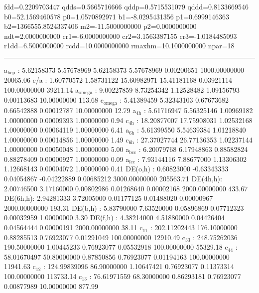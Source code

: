 \documentclass[11pt]{article}
\begin{document}
fdd=0.2209703447 qdds=0.5665716666 qddp=0.5715531079 qddd=0.8133669546 b0=52.1569460578 p0=1.0570892971 b1=-8.0295431356 p1=0.6999146363 b2=1366555.8524337406 m2=-11.5000000000 p2=0.0000000000 ndt=2.0000000000 cr1=-6.0000000000 cr2=3.1563387155 cr3=-1.0184485093 r1dd=6.5000000000 rcdd=10.0000000000 rmaxhm=10.1000000000 npar=18 

\noindent\rule{\textwidth}{0.5pt}
a\(_{\text{hcp}}\)   :   5.62158373   5.57678969   5.62158373   5.57678969   0.00200651 1000.00000000     20065.06
c/a     :   1.60770572   1.58731122  15.60982971  15.41181168   0.03921114 100.00000000     39211.14
a\(_{\text{omega}}\) :   9.00227859   8.73254342   1.12528482   1.09156793   0.00113683  10.00000000       113.68
c\(_{\text{omega}}\) :   5.41389459   5.32343103   0.67673682   0.66542888   0.00012787  10.00000000        12.79
a\(_{\text{4h}}\)    :   5.61716947   5.56325146   1.00969182   1.00000000   0.00009393   1.00000000         0.94
c\(_{\text{4h}}\)    :  18.20877007  17.75908031   1.02532168   1.00000000   0.00064119   1.00000000         6.41
a\(_{\text{6h}}\)    :   5.61399550   5.54639384   1.01218840   1.00000000   0.00014856   1.00000000         1.49
c\(_{\text{6h}}\)    :  27.37027744  26.77136353   1.02237144   1.00000000   0.00050048   1.00000000         5.00
a\(_{\text{bcc}}\)   :   6.20079768   6.17948863   0.88582824   0.88278409   0.00000927   1.00000000         0.09
a\(_{\text{fcc}}\)   :   7.93144116   7.88677000   1.13306302   1.12668143   0.00004072   1.00000000         0.41
DE(o,h) :   0.60823000  -0.63343333   0.04054867  -0.04222889   0.00685212 3000.00000000    205563.71
DE(4h,h):   2.00746500   3.17160000   0.00802986   0.01268640   0.00002168 2000.00000000       433.67
DE(6h,h):   2.94281333   3.72005000   0.01177125   0.01488020   0.00000967 2000.00000000       193.31
DE(b,h) :   5.83790000   7.63520000   0.05896869   0.07712323   0.00032959   1.00000000         3.30
DE(f,h) :   4.38214000   4.51880000   0.04426404   0.04564444   0.00000191 2000.00000000        38.11
c\(_{\text{11}}\)    : 202.11202443 176.10000000   0.88285513   0.76923077   0.01291049 100.00000000     12910.49
c\(_{\text{33}}\)    : 248.75262036 190.50000000   1.00445233   0.76923077   0.05532918 100.00000000     55329.18
c\(_{\text{44}}\)    :  58.01670497  50.80000000   0.87850856   0.76923077   0.01194163 100.00000000     11941.63
c\(_{\text{12}}\)    : 124.99839096  86.90000000   1.10647421   0.76923077   0.11373314 100.00000000    113733.14
c\(_{\text{13}}\)    :  76.61971559  68.30000000   0.86293181   0.76923077   0.00877989  10.00000000       877.99
\end{document}

